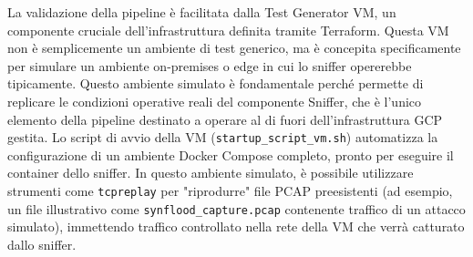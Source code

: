 \documentclass[11pt, a4paper]{article}
\begin{document}
La validazione della pipeline è facilitata dalla Test Generator VM, un componente cruciale dell'infrastruttura definita tramite Terraform. Questa VM non è semplicemente un ambiente di test generico, ma è concepita specificamente per simulare un ambiente on-premises o edge in cui lo sniffer opererebbe tipicamente. Questo ambiente simulato è fondamentale perché permette di replicare le condizioni operative reali del componente Sniffer, che è l'unico elemento della pipeline destinato a operare al di fuori dell'infrastruttura GCP gestita. Lo script di avvio della VM (\texttt{startup\_script\_vm.sh}) automatizza la configurazione di un ambiente Docker Compose completo, pronto per eseguire il container dello sniffer. In questo ambiente simulato, è possibile utilizzare strumenti come \texttt{tcpreplay} per "riprodurre" file PCAP preesistenti (ad esempio, un file illustrativo come \texttt{synflood\_capture.pcap} contenente traffico di un attacco simulato), immettendo traffico controllato nella rete della VM che verrà catturato dallo sniffer.
\end{document}
